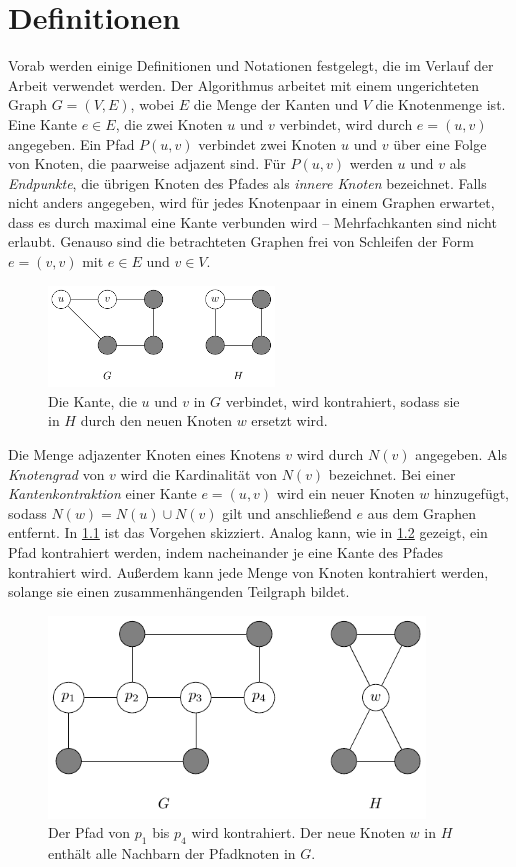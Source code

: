 \chapter{Definitionen}
\label{cha:definitionen}

Vorab werden einige Definitionen und Notationen festgelegt, die im Verlauf der Arbeit verwendet werden.
Der Algorithmus arbeitet mit einem ungerichteten Graph $G = (V, E)$, wobei $E$ die Menge der Kanten und $V$ die Knotenmenge ist.
Eine Kante $e \in E$, die zwei Knoten $u$ und $v$ verbindet, wird durch $e = (u, v)$ angegeben.
Ein Pfad $P(u, v)$ verbindet zwei Knoten $u$ und $v$ über eine Folge von Knoten, die paarweise adjazent sind.
Für $P(u, v)$ werden $u$ und $v$ als \emph{Endpunkte}, die übrigen Knoten des Pfades als \emph{innere Knoten} bezeichnet.
Falls nicht anders angegeben, wird für jedes Knotenpaar in einem Graphen erwartet, dass es durch maximal eine Kante verbunden wird -- Mehrfachkanten sind nicht erlaubt.
Genauso sind die betrachteten Graphen frei von Schleifen der Form $e = (v, v)$ mit $e \in E$ und $v \in V$.
\begin{figure}
  \includegraphics[width=6cm]{bilder/Kantenkontraktion.pdf}
  \caption{Die Kante, die $u$ und $v$ in $G$ verbindet, wird kontrahiert, sodass sie in $H$ durch den neuen Knoten $w$ ersetzt wird.}
  \label{fig:Kantenkontraktion}
\end{figure}
Die Menge adjazenter Knoten eines Knotens $v$ wird durch $N(v)$ angegeben.
Als \emph{Knotengrad} von $v$ wird die Kardinalität von $N(v)$ bezeichnet.
Bei einer \emph{Kantenkontraktion} einer Kante $e = (u, v)$ wird ein neuer Knoten $w$ hinzugefügt, sodass $N(w) = N(u) \cup N(v)$ gilt und anschließend $e$ aus dem Graphen entfernt.
In \Abb \ref{fig:Kantenkontraktion} ist das Vorgehen skizziert.
Analog kann, wie in \Abb \ref{fig:Pfadkontraktion} gezeigt, ein Pfad kontrahiert werden, indem nacheinander je eine Kante des Pfades kontrahiert wird.
Außerdem kann jede Menge von Knoten kontrahiert werden, solange sie einen zusammenhängenden Teilgraph bildet.
\begin{figure}[H]
  \centering
  \includegraphics[width=10cm]{bilder/Pfadkontraktion.pdf}
  \caption{Der Pfad von $p_1$ bis $p_4$ wird kontrahiert.
           Der neue Knoten $w$ in $H$ enthält alle Nachbarn der Pfadknoten in $G$.}
  \label{fig:Pfadkontraktion}
\end{figure}

